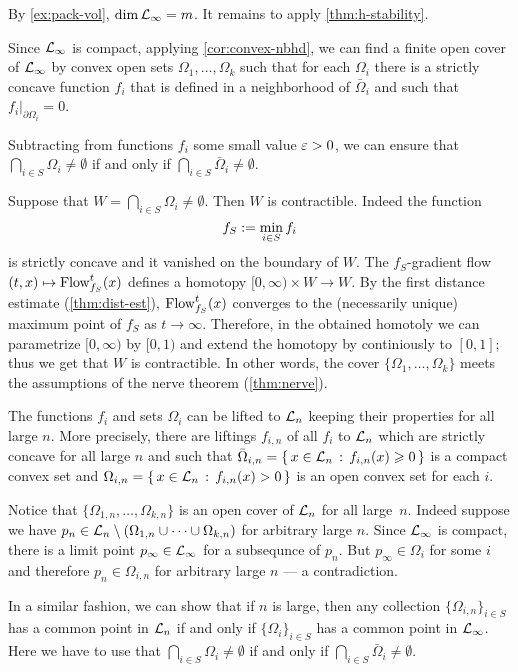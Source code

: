 By \ref{ex:pack-vol}, $\operatorname{\rm dim}\nolimits \mathcal{L}_\infty=m$.
It remains to apply \ref{thm:h-stability}.
\qeds

Since $\mathcal{L}_\infty$ is compact, applying \ref{cor:convex-nbhd}, we can find a finite open cover of $\mathcal{L}_\infty$ by convex open sets $\Omega_1,\dots, \Omega_k$ such that 
for each $\Omega_i$ there is a strictly concave function $f_i$ that is defined in a neighborhood of $\bar \Omega_i$ and such that $f_i|_{\partial \Omega_i}=0$.

Subtracting from functions $f_i$ some small value $\varepsilon>0$,
we can ensure that $\bigcap_{i\in S}\Omega_{i}\ne \emptyset$ if and only if $\bigcap_{i\in S}\bar\Omega_{i}\ne \emptyset$.

Suppose that $W=\bigcap_{i\in S}\Omega_{i}\ne \emptyset$.
Then $W$ is contractible.
Indeed the function 
\[f_S\mathrel{:=}\min_{i\in S} f_i\]
is strictly concave and it vanished on the boundary of $W$.
The $f_S$-gradient flow $(t,x)\mapsto \mathop{\rm Flow}\nolimits_{f_S}^t(x)$ defines a homotopy
$[0,\infty)\times W\to W$.
By the first distance estimate (\ref{thm:dist-est}), $\mathop{\rm Flow}\nolimits_{f_S}^t(x)$ converges to the (necessarily unique) maximum point of $f_S$ as $t\to\infty$.
Therefore, in the obtained homotoly we can parametrize $[0,\infty)$ by $[0,1)$ and extend the homotopy by continiously to $[0,1]$;
thus we get that $W$ is contractible.
In other words, the cover $\{\Omega_1,\dots, \Omega_k\}$ meets the assumptions of the nerve theorem (\ref{thm:nerve}).

The functions $f_i$ and sets $\Omega_i$ can be lifted to $\mathcal{L}_n$ keeping their properties for all large $n$. 
More precisely, there are liftings $f_{i,n}$ of all $f_i$ to $\mathcal{L}_n$ which are strictly concave for all large $n$ and such that $\bar\Omega_{i,n}=\left\{\,{x\in \mathcal{L}_n}\,:\,{f_{i,n}(x)\geqslant 0}\,\right\}$ is a compact convex set and $\Omega_{i,n}=\left\{\,{x\in \mathcal{L}_n}\,:\,{f_{i,n}(x)> 0}\,\right\}$ is an open convex set for each $i$.

Notice that $\{\Omega_{1,n},\dots,\Omega_{k,n}\}$ is an open cover of $\mathcal{L}_n$ for all large~$n$.
Indeed suppose we have $p_n\in \mathcal{L}_n\setminus(\Omega_{1,n}\cup\dots\cup\Omega_{k,n})$ for arbitrary large $n$.
Since $\mathcal{L}_\infty$ is compact, there is a limit point $p_\infty\in \mathcal{L}_\infty$ for a subsequnce of $p_n$.
But $p_\infty\in\Omega_i$ for some $i$ and therefore $p_n\in \Omega_{i,n}$ for arbitrary large $n$ --- a contradiction.

In a similar fashion, we can show that if $n$ is large, then any collection $\{\Omega_{i,n}\}_{i\in S}$ has a common point in $\mathcal{L}_n$ 
if and only if $\{\Omega_{i}\}_{i\in S}$ has a common point in $\mathcal{L}_\infty$.
Here we have to use that $\bigcap_{i\in S}\Omega_{i}\ne \emptyset$ if and only if $\bigcap_{i\in S}\bar\Omega_{i}\ne \emptyset$.

